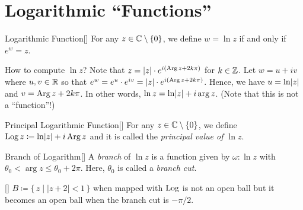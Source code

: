 \documentclass[../complex_variables_1.tex]{subfiles}
\begin{document}
\section{Logarithmic ``Functions''}

\begin{Definition}{Logarithmic Function}[]
    For any \(z \in \CC \setminus \{0\}\),
    we define \(w = \ln z\) if and only if \(e^w = z\).
\end{Definition}

\begin{note}
    How to compute \(\ln z\)?
    Note that \(z = \lvert z\rvert \cdot e^{i(\operatorname{Arg} z + 2k\pi)}\)
    for \(k \in \ZZ\).
    Let \(w = u + iv\) where \(u, v \in \RR\)
    so that \(e^w = e^u \cdot e^{iv} = \lvert z\rvert \cdot e^{i(\operatorname{Arg} z + 2k\pi)}\).
    Hence, we have \(u = \ln\lvert z\rvert\) and \(v = \operatorname{Arg} z + 2k\pi\).
    In other words, \(\ln z = \ln\lvert z\rvert + i\arg z\). (Note that this is not a ``function''!)
\end{note}


\begin{Definition}{Principal Logarithmic Function}[]
    For any \(z \in \CC \setminus \{0\}\),
    we define \(\operatorname{Log} z \coloneqq \ln\lvert z\rvert + i \operatorname{Arg} z\)
    and it is called the \emph{principal value of \(\ln z\)}.
\end{Definition}

\begin{Definition}{Branch of Logarithm}[]
    A \emph{branch} of \(\ln z\) is a function given by
    \(\omega \colon \ln z\) with \(\theta_0 < \arg z \le \theta_0 + 2\pi\).
    Here, \(\theta_0\) is called a \emph{branch cut}.
\end{Definition}

\begin{Example}{}[]
    \(B \coloneqq \{\,z \mid |z+2| < 1\,\}\) when mapped with
    \(\operatorname{Log}\) is not an open ball but it becomes an open ball when
    the branch cut is \(-\pi/2\).
\end{Example}
\end{document}
